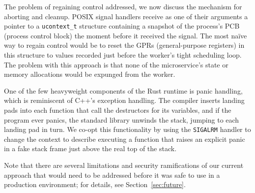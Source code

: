 The problem of regaining control addressed, we now discuss the mechanism for aborting
and cleanup.  POSIX signal handlers receive as one of their arguments a pointer to a
\texttt{ucontext\_t} structure containing a snapshot of the process's PCB (process
control block) the moment before it received the signal.  The most na\"ive way to
regain control would be to reset the GPRs (general-purpose registers) in this
structure to values recorded just before the worker's tight scheduling loop.  The
problem with this approach is that none of the microservice's state or memory
allocations would be expunged from the worker.

One of the few heavyweight components of the Rust runtime is panic handling, which is
reminiscent of C++'s exception handling.  The compiler inserts landing pads into each
function that call the destructors for its variables, and if the program ever panics,
the standard library unwinds the stack, jumping to each landing pad in turn.  We
co-opt this functionality by using the \texttt{SIGALRM} handler to change the context
to describe executing a function that raises an explicit panic in a fake stack frame
just above the real top of the stack.

Note that there are several limitations and security ramifications of our current
approach that would need to be addressed before it was safe to use in a production
environment; for details, see Section~\ref{sec:future}.

